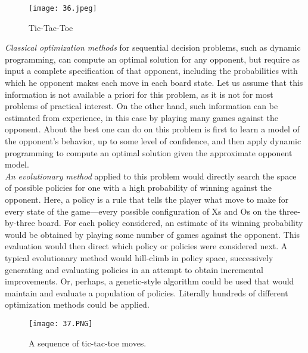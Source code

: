 \begin{wrapfigure}{h}{0.4\textwidth}
    \texttt{[image: 36.jpeg]}
  \caption{Tic-Tac-Toe}
  \label{fig:tic-tac-toe}
\end{wrapfigure}

\emph{Classical optimization methods} for sequential decision problems, such as dynamic programming, can compute an optimal solution for any opponent, but require as input a complete specification of that opponent, including the probabilities with which he opponent makes each move in each board state. 
Let us assume that this information is not available a priori for this problem, as it is not for
most problems of practical interest. On the other hand, such information can be estimated from experience, in this case by playing many games against the opponent. About the best one can do on this problem is first to learn a model of the opponent's behavior, up to some level of
confidence, and then apply dynamic programming to compute an optimal solution given
the approximate opponent model. \\
\emph{An evolutionary method }applied to this problem would directly search the space
of possible policies for one with a high probability of winning against the opponent.
Here, a policy is a rule that tells the player what move to make for every state of the
game—every possible configuration of Xs and Os on the three-by-three board. For each
policy considered, an estimate of its winning probability would be obtained by playing
some number of games against the opponent. This evaluation would then direct which
policy or policies were considered next. A typical evolutionary method would hill-climb
in policy space, successively generating and evaluating policies in an attempt to obtain
incremental improvements. Or, perhaps, a genetic-style algorithm could be used that
would maintain and evaluate a population of policies. Literally hundreds of different
optimization methods could be applied. \\

\begin{wrapfigure}{l}{0.4\textwidth}
    \texttt{[image: 37.PNG]}
  \caption{A sequence of tic-tac-toe moves.}
  \label{fig:tic-tac-toe moves}
\end{wrapfigure}

